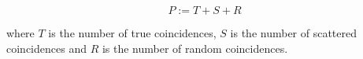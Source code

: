             \begin{equation}
                P := T + S + R
            \end{equation}
            
            \noindent where $T$ is the number of true coincidences, $S$ is the number of scattered coincidences and $R$ is the number of random coincidences. %
            
                    
                    
                
                
